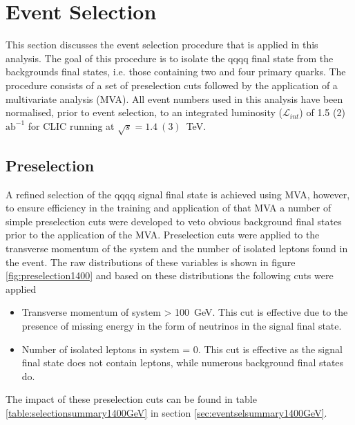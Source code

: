 
\section{Event Selection}
\label{sec:eventselection}
This section discusses the event selection procedure that is applied in this analysis.  The goal of this procedure is to isolate the \nu{\nu}qqqq final state from the backgrounds final states, i.e. those containing two and four primary quarks.  The procedure consists of a set of preselection cuts followed by the application of a multivariate analysis (MVA).  All event numbers used in this analysis have been normalised, prior to event selection, to an integrated luminosity ($\mathcal{L}_{int}$) of 1.5 (2) $\text{ab}^{-1}$ for CLIC running at $\sqrt{s}=1.4~(3)$~TeV.


\subsection{Preselection}
\label{sec:preselection1400GeV}
A refined selection of the \nu{\nu}qqqq signal final state is achieved using MVA, however, to ensure efficiency in the training and application of that MVA a number of simple preselection cuts were developed to veto obvious background final states prior to the application of the MVA.  Preselection cuts were applied to the transverse momentum of the system and the number of isolated leptons found in the event.  The raw distributions of these variables is shown in figure \ref{fig:preselection1400} and based on these distributions the following cuts were applied
%
\begin{itemize}
\item Transverse momentum of system > 100~GeV.  This cut is effective due to the presence of missing energy in the form of neutrinos in the signal final state.
\item Number of isolated leptons in system = 0.  This cut is effective as the signal final state does not contain leptons, while numerous background final states do.  
\end{itemize}
%
\noindent The impact of these preselection cuts can be found in table \ref{table:selectionsummary1400GeV} in section \ref{sec:eventselsummary1400GeV}.

